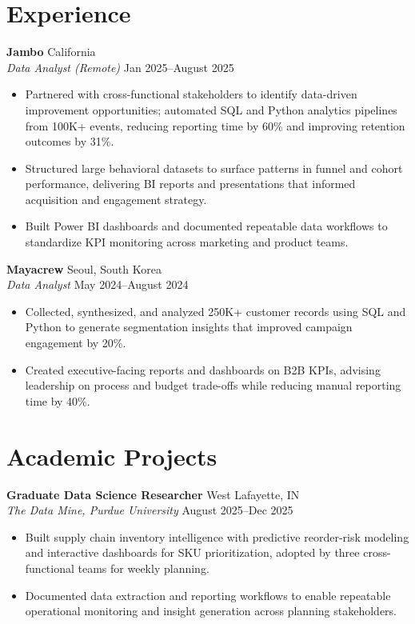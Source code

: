 \documentclass[11pt,a4paper]{article}
\begin{document}
\section*{Experience}
\noindent
\textbf{Jambo} \hfill California \\
\textit{Data Analyst (Remote)} \hfill Jan 2025--August 2025
\begin{itemize}[leftmargin=*, noitemsep, topsep=0pt]
    \item Partnered with cross-functional stakeholders to identify data-driven improvement opportunities; automated SQL and Python analytics pipelines from 100K+ events, reducing reporting time by 60\% and improving retention outcomes by 31\%.
    \item Structured large behavioral datasets to surface patterns in funnel and cohort performance, delivering BI reports and presentations that informed acquisition and engagement strategy.
    \item Built Power BI dashboards and documented repeatable data workflows to standardize KPI monitoring across marketing and product teams.
\end{itemize}
\vspace{6pt}

\noindent
\textbf{Mayacrew} \hfill Seoul, South Korea \\
\textit{Data Analyst} \hfill May 2024--August 2024
\begin{itemize}[leftmargin=*, noitemsep, topsep=0pt]
    \item Collected, synthesized, and analyzed 250K+ customer records using SQL and Python to generate segmentation insights that improved campaign engagement by 20\%.
    \item Created executive-facing reports and dashboards on B2B KPIs, advising leadership on process and budget trade-offs while reducing manual reporting time by 40\%.
\end{itemize}

\section*{Academic Projects}
\noindent
\textbf{Graduate Data Science Researcher} \hfill West Lafayette, IN \\
\textit{The Data Mine, Purdue University} \hfill August 2025--Dec 2025
\begin{itemize}[leftmargin=*, noitemsep, topsep=0pt]
    \item Built supply chain inventory intelligence with predictive reorder-risk modeling and interactive dashboards for SKU prioritization, adopted by three cross-functional teams for weekly planning.
    \item Documented data extraction and reporting workflows to enable repeatable operational monitoring and insight generation across planning stakeholders.
\end{itemize}
\vspace{6pt}
\end{document}
